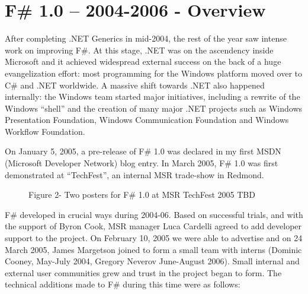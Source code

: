 \documentclass[acmsmall,review]{acmart}\settopmatter{printfolios=true,printccs=false,printacmref=false}
\begin{document}
\section*{F\# 1.0 – 2004-2006 - Overview}

After completing .NET Generics in mid-2004, the rest of the year saw intense work on improving F\#. At this stage, .NET was on the ascendency inside Microsoft and it achieved widespread external success on the back of a huge evangelization effort: most programming for the Windows platform moved over to C\# and .NET worldwide. A massive shift towards .NET also happened internally: the Windows team started major initiatives, including a rewrite of the Windows “shell” and the creation of many major .NET projects such as Windows Presentation Foundation, Windows Communication Foundation and Windows Workflow Foundation.

On January 5, 2005, a pre-release of F\# 1.0 was declared in my first MSDN (Microsoft Developer Network) blog entry.  In March 2005, F\# 1.0 was first demonstrated at “TechFest”, an internal MSR trade-show in Redmond.  

\begin{figure}
Figure 2- Two posters for F\# 1.0 at MSR TechFest 2005
TBD
\end{figure}


F\# developed in crucial ways during 2004-06.  Based on successful trials, and with the support of Byron Cook, MSR manager Luca Cardelli agreed to add developer support to the project. On February 10, 2005 we were able to advertise and on 24 March 2005, James Margetson joined to form a small team with interns (Dominic Cooney, May-July 2004, Gregory Neverov June-August 2006). Small internal and external user communities grew and trust in the project began to form. The technical additions made to F\# during this time were as follows:
\end{document}
